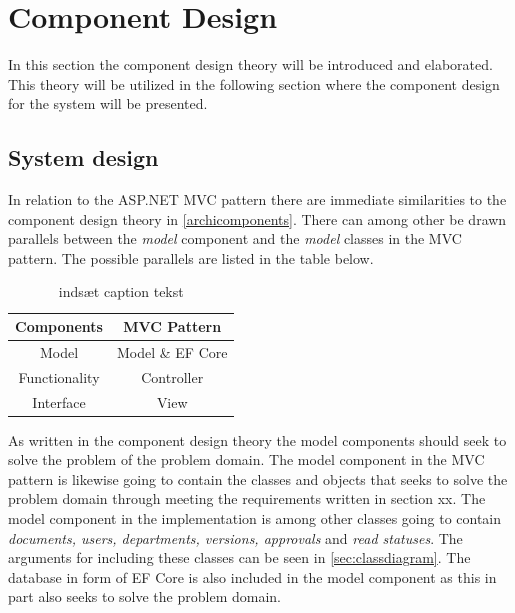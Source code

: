 \section{Component Design} \label{sec:componentdesign}

In this section the component design theory will be introduced and elaborated.
This theory will be utilized in the following section where the component design for the system will be presented.



\subsection{System design} \label{sec:systemdesign}

In relation to the ASP.NET MVC pattern there are immediate similarities to the component design theory in \cref{archicomponents}.
There can among other be drawn parallels between the \textit{model} component and the \textit{model} classes in the MVC pattern.
The possible parallels are listed in the table below.
\begin{table}
	\centering
	\begin{tabular}{| c | c | }
	\hline
	\textbf{Components} & \textbf{MVC Pattern} \\
	\hline
	Model & Model \& EF Core \\
	\hline
	Functionality & Controller \\
	\hline
	Interface & View \\
	\hline
\end{tabular}
\caption{{\color{red}indsæt caption tekst}}\label{tab:PatternParallels}
\end{table}

As written in the component design theory the model components should seek to solve the problem of the problem domain.
The model component in the MVC pattern is likewise going to contain the classes and objects that seeks to solve the problem domain through meeting the requirements written in {\color{red}section xx}.
The model component in the implementation is among other classes going to contain \textit{documents, users, departments, versions, approvals} and \textit{read statuses}.
The arguments for including these classes can be seen in \cref{sec:classdiagram}.
The database in form of EF Core is also included in the model component as this in part also seeks to solve the problem domain.

